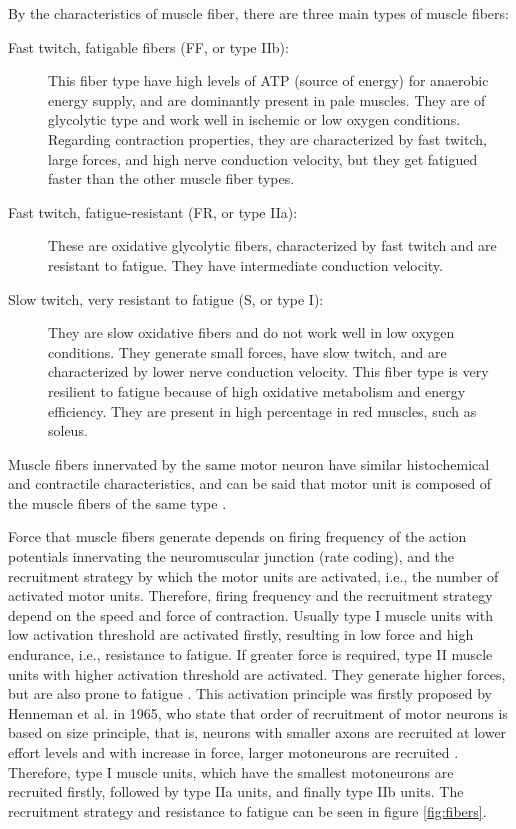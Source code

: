 By the characteristics of muscle fiber, there are three main types of muscle fibers:
\begin{description}
\item[Fast twitch, fatigable fibers (FF, or type IIb):] This fiber type have high levels of ATP (source of energy) for anaerobic energy supply, and are dominantly present in pale muscles. They are of glycolytic type and work well in ischemic or low oxygen conditions. Regarding contraction properties, they are characterized by fast twitch, large forces, and high nerve conduction velocity, but they get fatigued faster than the other muscle fiber types. 

\item[Fast twitch, fatigue-resistant (FR, or type IIa):] These are oxidative glycolytic fibers, characterized by fast twitch and are resistant to fatigue. They have intermediate conduction velocity. 

\item[Slow twitch, very resistant to fatigue (S, or type I):] They are slow oxidative fibers and do not work well in low oxygen conditions. They generate small forces, have slow twitch, and are characterized by lower nerve conduction velocity. This fiber type is very resilient to fatigue because of high oxidative metabolism and energy efficiency. They are present in high percentage in red muscles, such as soleus.
\end{description}

Muscle fibers innervated by the same motor neuron have similar histochemical and contractile characteristics, and can be said that motor unit is composed of the muscle fibers of the same type \citep{Merletti-book}.


Force that muscle fibers generate depends on firing frequency of the action potentials innervating the neuromuscular junction (rate coding), and the recruitment strategy by which the motor units are activated, i.e., the number of activated motor units. Therefore, firing frequency and the recruitment strategy depend on the speed and force of contraction. Usually type I muscle units with low activation threshold are activated firstly, resulting in low force and high endurance, i.e., resistance to fatigue. If greater force is required, type II muscle units with higher activation threshold are activated. They generate higher forces, but are also prone to fatigue \citep{Freund1975, Merletti-book}. This activation principle was firstly proposed by Henneman et al. in 1965, who state that order of recruitment of motor neurons is based on size principle, that is, neurons with smaller axons are recruited at lower effort levels and with increase in force, larger motoneurons are recruited \citep{Henneman1965}. Therefore, type I muscle units, which have the smallest motoneurons are recruited firstly, followed by type IIa units, and finally type IIb units. The recruitment strategy and resistance to fatigue can be seen in figure \ref{fig:fibers}. 

